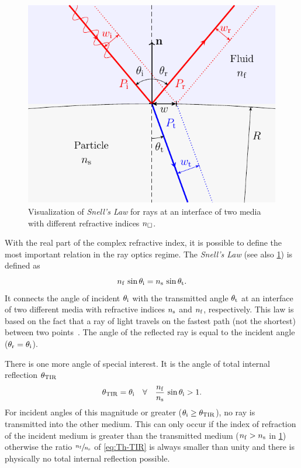 \begin{figure}[tbp]
  \centering
  \includegraphics[]{Plots/cache/Snell.pdf}
  \caption{Visualization of \emph{Snell's Law} for rays at an interface of two 
  media with different refractive indices $n_{\Box}$.}
  \label{fig:Th-Snell}
\end{figure}

With the real part of the complex refractive index, it is possible to define 
the most important relation in the ray optics regime. The \emph{Snell's Law} 
(see also \cref{fig:Th-Snell}) is defined as
\begin{equation}
  n_{\mathrm{f}}\,\sin\theta_{\mathrm{i}} = n_{\mathrm{s}}\,\sin\theta_{\mathrm{t}}.
  \label{eq:Th-Snell}
\end{equation}
It connects the angle of incident $\theta_{\mathrm{i}}$ with the transmitted angle 
$\theta_{\mathrm{t}}$ at an interface of two different media with refractive indices 
$n_{\mathrm{s}}$ and $n_{\mathrm{f}}$, respectively. This law is based on the fact that a ray of 
light travels on the fastest path (not the shortest) between two 
points~\cite{Born1980Ch3}. The angle of the reflected ray is equal to the 
incident angle ($\theta_{\mathrm{r}}=\theta_{\mathrm{i}}$).

There is one more angle of special interest. It is the angle of total internal 
reflection $\theta_{\mathrm{TIR}}$
\begin{equation}
  \theta_{\mathrm{TIR}}=\theta_{\mathrm{i}} \quad\forall\quad \frac{n_{\mathrm{f}}}{n_{\mathrm{s}}}\,\sin\theta_{\mathrm{i}} 
  > 1.
  \label{eq:Th-TIR}
\end{equation}
For incident angles of this magnitude or greater 
($\theta_{\mathrm{i}}\geq\theta_{\mathrm{TIR}}$), no ray is transmitted into the other 
medium. This can only occur if the index of refraction of the incident medium 
is greater than the transmitted medium ($n_{\mathrm{f}}>n_{\mathrm{s}}$ in \cref{fig:Th-Snell}) 
otherwise the ratio $\sfrac{n_{\mathrm{f}}}{n_{\mathrm{s}}}$ of \cref{eq:Th-TIR} is always smaller 
than unity and there is physically no total internal reflection possible.

